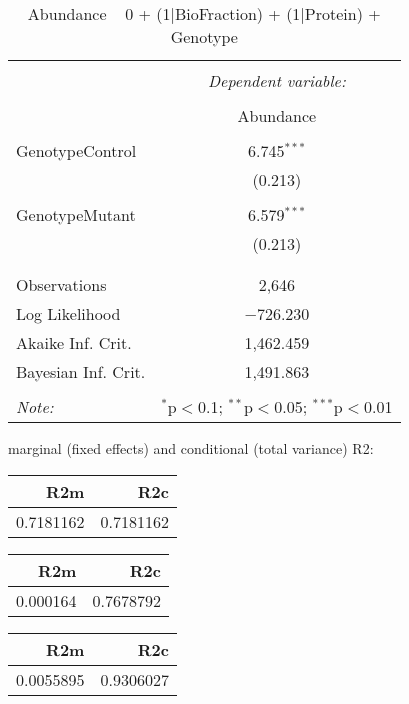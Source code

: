 \documentclass[11pt]{report}
\begin{document}
\begin{table}[!htbp] \centering 
  \caption{Abundance ~ 0 + (1|BioFraction) + (1|Protein) + Genotype} 
  \label{} 
\begin{tabular}{@{\extracolsep{5pt}}lc} 
\\[-1.8ex]\hline 
\hline \\[-1.8ex] 
 & \multicolumn{1}{c}{\textit{Dependent variable:}} \\ 
\cline{2-2} 
\\[-1.8ex] & Abundance \\ 
\hline \\[-1.8ex] 
 GenotypeControl & 6.745$^{***}$ \\ 
  & (0.213) \\ 
  & \\ 
 GenotypeMutant & 6.579$^{***}$ \\ 
  & (0.213) \\ 
  & \\ 
\hline \\[-1.8ex] 
Observations & 2,646 \\ 
Log Likelihood & $-$726.230 \\ 
Akaike Inf. Crit. & 1,462.459 \\ 
Bayesian Inf. Crit. & 1,491.863 \\ 
\hline 
\hline \\[-1.8ex] 
\textit{Note:}  & \multicolumn{1}{r}{$^{*}$p$<$0.1; $^{**}$p$<$0.05; $^{***}$p$<$0.01} \\ 
\end{tabular} 
\end{table} 
marginal (fixed effects) and conditional (total variance) R2:

\begin{tabular}{r|r}
\hline
R2m & R2c\\
\hline
0.7181162 & 0.7181162\\
\hline
\end{tabular}

\begin{tabular}{r|r}
\hline
R2m & R2c\\
\hline
0.000164 & 0.7678792\\
\hline
\end{tabular}

\begin{tabular}{r|r}
\hline
R2m & R2c\\
\hline
0.0055895 & 0.9306027\\
\hline
\end{tabular}
\end{document}
